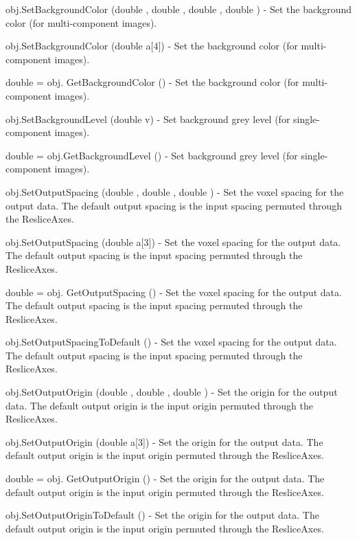 \begin{DoxyItemize}
\item {\ttfamily obj.\-Set\-Background\-Color (double , double , double , double )} -\/ Set the background color (for multi-\/component images).  
\item {\ttfamily obj.\-Set\-Background\-Color (double a\mbox{[}4\mbox{]})} -\/ Set the background color (for multi-\/component images).  
\item {\ttfamily double = obj. Get\-Background\-Color ()} -\/ Set the background color (for multi-\/component images).  
\item {\ttfamily obj.\-Set\-Background\-Level (double v)} -\/ Set background grey level (for single-\/component images).  
\item {\ttfamily double = obj.\-Get\-Background\-Level ()} -\/ Set background grey level (for single-\/component images).  
\item {\ttfamily obj.\-Set\-Output\-Spacing (double , double , double )} -\/ Set the voxel spacing for the output data. The default output spacing is the input spacing permuted through the Reslice\-Axes.  
\item {\ttfamily obj.\-Set\-Output\-Spacing (double a\mbox{[}3\mbox{]})} -\/ Set the voxel spacing for the output data. The default output spacing is the input spacing permuted through the Reslice\-Axes.  
\item {\ttfamily double = obj. Get\-Output\-Spacing ()} -\/ Set the voxel spacing for the output data. The default output spacing is the input spacing permuted through the Reslice\-Axes.  
\item {\ttfamily obj.\-Set\-Output\-Spacing\-To\-Default ()} -\/ Set the voxel spacing for the output data. The default output spacing is the input spacing permuted through the Reslice\-Axes.  
\item {\ttfamily obj.\-Set\-Output\-Origin (double , double , double )} -\/ Set the origin for the output data. The default output origin is the input origin permuted through the Reslice\-Axes.  
\item {\ttfamily obj.\-Set\-Output\-Origin (double a\mbox{[}3\mbox{]})} -\/ Set the origin for the output data. The default output origin is the input origin permuted through the Reslice\-Axes.  
\item {\ttfamily double = obj. Get\-Output\-Origin ()} -\/ Set the origin for the output data. The default output origin is the input origin permuted through the Reslice\-Axes.  
\item {\ttfamily obj.\-Set\-Output\-Origin\-To\-Default ()} -\/ Set the origin for the output data. The default output origin is the input origin permuted through the Reslice\-Axes.  

\end{DoxyItemize}
